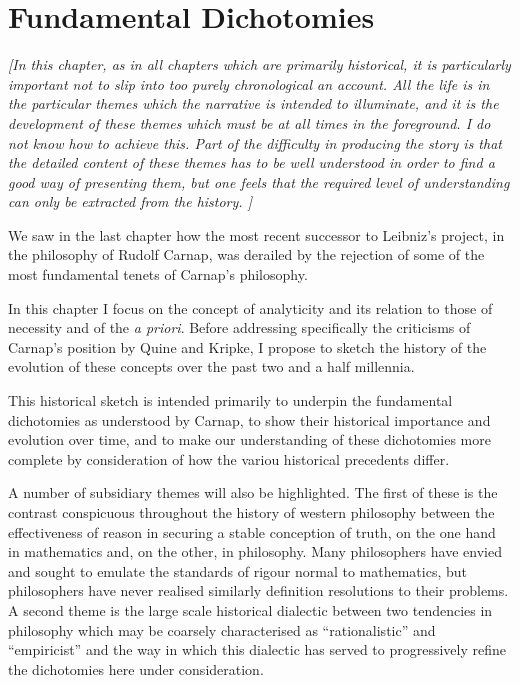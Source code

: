 \chapter{Fundamental Dichotomies}\label{FundamentalDichotomies}

\emph{[In this chapter, as in all chapters which are primarily
    historical, it is particularly important not to slip into too
    purely chronological an account. 
All the life is in the particular themes which the narrative is
intended to illuminate, and it is the development of these
themes which must be at all times in the foreground. 
I do not know how to achieve this.
Part of the difficulty in producing the story is that the detailed
content of these themes has to be well understood in order to find a
good way of presenting them, but one feels that the required level of
understanding can only be extracted from the history. 
]}

We saw in the last chapter how the most recent successor to
Leibniz's project, in the philosophy of Rudolf
Carnap, was derailed by the rejection of some of
the most fundamental tenets of Carnap's philosophy. 

In this chapter I focus on the concept of analyticity and
its relation to those of necessity and of the \emph{a priori}.
Before addressing specifically the criticisms of Carnap's position by
Quine and Kripke, I propose to sketch the history of the evolution of
these concepts over the past two and a half millennia.

This historical sketch is intended primarily to underpin the
fundamental dichotomies as understood by Carnap, to show their
historical importance and evolution over time, and to make our
understanding of these dichotomies more complete by consideration of
how the variou historical precedents differ.

A number of subsidiary themes will also be highlighted.
The first of these is the contrast conspicuous throughout the history of
western philosophy between the effectiveness of reason in securing a
stable conception of truth, on the one hand in mathematics and, on the
other, in philosophy.
Many philosophers have envied and sought to emulate the standards of
rigour normal to mathematics, but philosophers have never realised
similarly definition resolutions to their problems.
A second theme is the large scale historical dialectic between two
tendencies in philosophy which may be coarsely characterised as
``rationalistic'' and ``empiricist'' and the way in which this
dialectic has served to progressively refine the dichotomies here
under consideration.

